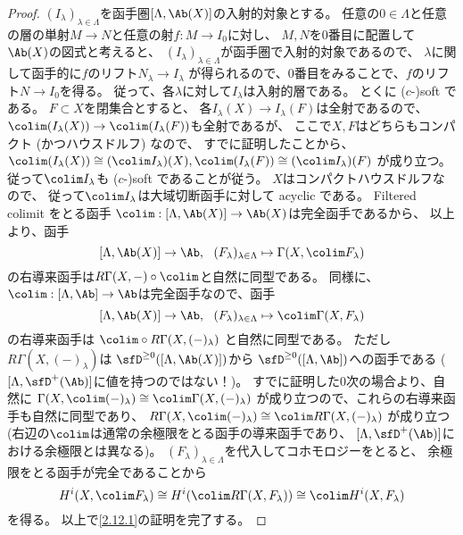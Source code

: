 \documentclass[uplatex,dvipdfmx]{jsarticle}
\begin{document}
\begin{proof}
  \((I_{\lambda})_{\lambda\in \Lambda}\)を函手圏\([\Lambda,\Ab(X)]\)の入射的対象とする。
  任意の\(0\in \Lambda\)と任意の層の単射\(M\to N\)と任意の射\(f:M\to I_0\)に対し、
  \(M,N\)を\(0\)番目に配置して\(\Ab(X)\)の図式と考えると、
  \((I_{\lambda})_{\lambda\in \Lambda}\)が函手圏で入射的対象であるので、
  \(\lambda\)に関して函手的に\(f\)のリフト\(N_{\lambda}\to I_{\lambda}\)
  が得られるので、\(0\)番目をみることで、\(f\)のリフト\(N\to I_0\)を得る。
  従って、各\(\lambda\)に対して\(I_{\lambda}\)は入射的層である。
  とくに (\(c\)-)soft である。
  \(F\subset X\)を閉集合とすると、
  各\(I_{\lambda}(X)\to I_{\lambda}(F)\)は全射であるので、
  \(\colim(I_{\lambda}(X))\to \colim(I_{\lambda}(F))\)も全射であるが、
  ここで\(X,F\)はどちらもコンパクト (かつハウスドルフ) なので、
  すでに証明したことから、
  \(\colim(I_{\lambda}(X))\cong (\colim I_{\lambda})(X),
  \colim(I_{\lambda}(F))\cong (\colim I_{\lambda})(F)\)
  が成り立つ。
  従って\(\colim I_{\lambda}\)も (\(c\)-)soft であることが従う。
  \(X\)はコンパクトハウスドルフなので、
  従って\(\colim I_{\lambda}\)は大域切断函手に対して acyclic である。
  Filtered colimit をとる函手
  \(\colim:[\Lambda,\Ab(X)]\to \Ab(X)\)は完全函手であるから、
  以上より、函手
  \[
  [\Lambda,\Ab(X)]\to \Ab, \ \
  (F_{\lambda})_{\lambda\in \Lambda}\mapsto \Gamma(X,\colim F_{\lambda})
  \]
  の右導来函手は\(R\Gamma(X,-)\circ \colim\)と自然に同型である。
  同様に、\(\colim:[\Lambda,\Ab]\to \Ab\)は完全函手なので、函手
  \[
  [\Lambda,\Ab(X)]\to \Ab, \ \
  (F_{\lambda})_{\lambda\in \Lambda}\mapsto \colim \Gamma(X,F_{\lambda})
  \]
  の右導来函手は
  \(\colim \circ R\Gamma(X,(-)_{\lambda})\)
  と自然に同型である。
  ただし
  \(R\Gamma(X,(-)_{\lambda})\)は
  \(\sfD^{\geq 0}([\Lambda,\Ab(X)])\)から
  \(\sfD^{\geq 0}([\Lambda,\Ab])\)への函手である
  (\([\Lambda,\sfD^+(\Ab)]\)に値を持つのではない！)。
  すでに証明した\(0\)次の場合より、自然に
  \(\Gamma(X,\colim (-)_{\lambda}) \cong \colim \Gamma(X,(-)_{\lambda})\)
  が成り立つので、これらの右導来函手も自然に同型であり、
  \(R\Gamma(X,\colim (-)_{\lambda}) \cong \colim R\Gamma(X,(-)_{\lambda})\)
  が成り立つ
  (右辺の\(\colim\)は通常の余極限をとる函手の導来函手であり、
  \([\Lambda,\sfD^+(\Ab)]\)における余極限とは異なる)。
  \((F_{\lambda})_{\lambda\in \Lambda}\)を代入してコホモロジーをとると、
  余極限をとる函手が完全であることから
  \[
  H^i(X,\colim F_{\lambda})\cong
  H^i(\colim R\Gamma(X,F_{\lambda})) \cong
  \colim H^i(X,F_{\lambda})
  \]
  を得る。
  以上で\ref{2.12.1}の証明を完了する。


\end{proof}
\end{document}
